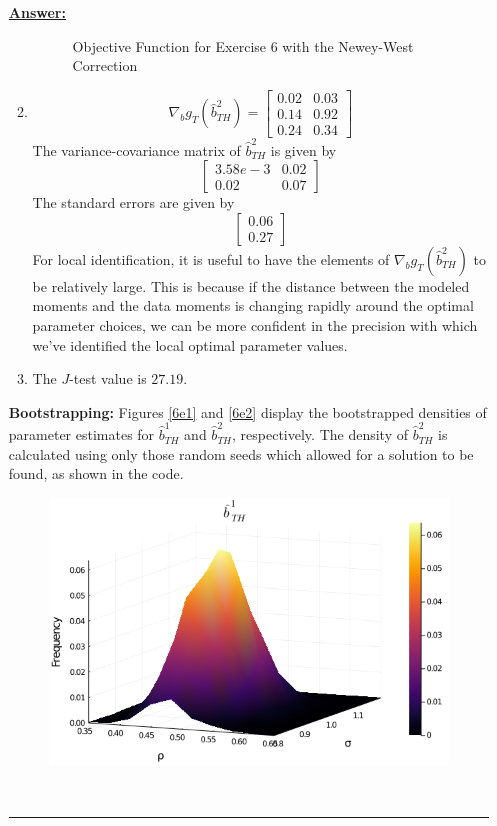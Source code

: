 \documentclass{article} %
\theoremstyle{definition}
\newenvironment{solution}[1][Answer]{\begin{singlespace}\underline{\textbf{#1:}}\quad }{\ \rule{0.3em}{0.3em}\end{singlespace}} %
\begin{document}
\begin{enumerate}
\begin{solution}
\begin{enumerate}[label=(\alph*)]
\begin{figure}[htbp]
				\caption{Objective Function for Exercise 6 with the Newey-West Correction \label{6b}}
			\end{figure}
			\item
				\begin{equation*}
					\nabla_{b} g_{T}(\hat{b}^{2}_{TH})=\begin{bmatrix}
											0.02 & 0.03 \\
											0.14 & 0.92 \\
											0.24 & 0.34
											\end{bmatrix}
				\end{equation*}
				The variance-covariance matrix of $\hat{b}^{2}_{TH}$ is given by
				\begin{equation*}
											\begin{bmatrix}
											3.58e-3 & 0.02 \\
											0.02 & 0.07
											\end{bmatrix}
				\end{equation*}
				The standard errors are given by
				\begin{equation*}
											\begin{bmatrix}
											 0.06 \\
											0.27
											\end{bmatrix}
				\end{equation*}
				For local identification, it is useful to have the elements of $\nabla_{b} g_{T}(\hat{b}^{2}_{TH})$ to be relatively large. This is because if the distance between the modeled moments and the data moments is changing rapidly around the optimal parameter choices, we can be more confident in the precision with which we've identified the local optimal parameter values.
			\item The $J$-test value is $27.19$.
		\end{enumerate}
		\textbf{Bootstrapping:} Figures \ref{6e1} and \ref{6e2} display the bootstrapped densities of parameter estimates for $\hat{b}^{1}_{TH}$ and $\hat{b}^{2}_{TH}$, respectively. The density of $\hat{b}^{2}_{TH}$ is calculated using only those random seeds which allowed for a solution to be found, as shown in the code.
			\begin{figure}[htbp] 
				\centering
				\includegraphics[scale=.5]{Figures/Exercise6Bootstrapping1.png}

\end{figure}
\end{solution}
\end{enumerate}
\end{document}
